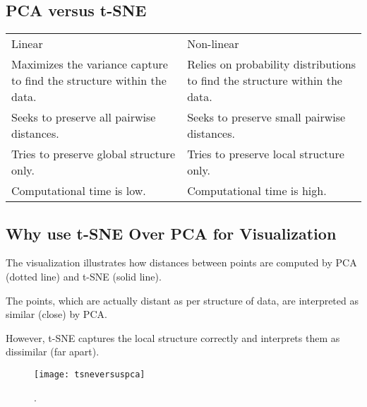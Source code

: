 	\subsection{PCA versus t-SNE}
	\begin{tabular}{|p{}|p{}|} \hline
			\tablecolumnheadervlinesone{PCA} & \tablecolumnheadervlinestwo{t-SNE} \\ \hline
			Linear &
            Non-linear \\ \hline
			Maximizes the variance capture to find the structure within the data. &
			Relies on probability distributions to find the structure within the data.  \\ \hline
			Seeks to preserve all pairwise distances. &
			Seeks to preserve small pairwise distances. \\ \hline
			Tries to preserve global structure only. &
			Tries to preserve local structure only. \\ \hline
			Computational time is low. &
			Computational time is high. \\ \hline%
	\end{tabular}


	\subsection{Why use t-SNE Over PCA for Visualization}
	\begin{bulletedlist}
		\item The visualization illustrates how distances between points are computed by PCA (dotted line) and t-SNE (solid line).
		\item The points, which are actually distant as per structure of data, are interpreted as similar (close) by PCA.
		\item However, t-SNE captures the local structure correctly and interprets them as dissimilar (far apart).
	\end{bulletedlist}

 	\begin{figure}[h]
		\centering
		\texttt{[image: tsneversuspca]}
		\caption{.}
		\label{fig:tsneversuspca}
	\end{figure}

